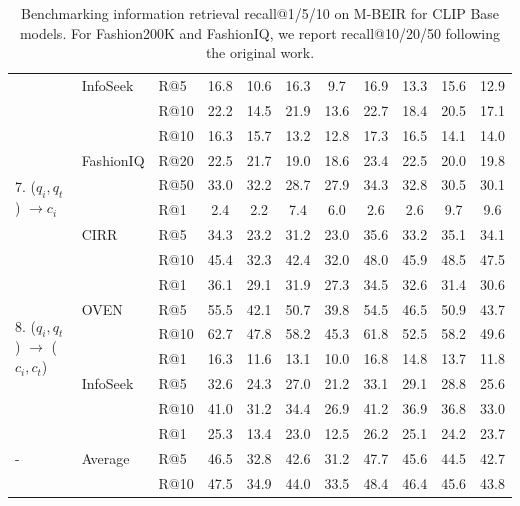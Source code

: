 \begin{table}[]
{\begin{tabular}{lll|cccc|cccc}
 & InfoSeek & R@5 & 16.8 & 10.6 & 16.3 & 9.7 & 16.9 & 13.3 & 15.6 & 12.9\\
 &  & R@10 & 22.2 & 14.5 & 21.9 & 13.6 & 22.7 & 18.4 & 20.5 & 17.1\\
 \midrule
\multirow{6}{*}{7. ($q_i, q_t$) $	\to c_i$} &  & R@10 & 16.3 & 15.7 & 13.2 & 12.8 & 17.3 & 16.5 & 14.1 & 14.0\\
 & FashionIQ & R@20 & 22.5 & 21.7 & 19.0 & 18.6 & 23.4 & 22.5 & 20.0 & 19.8\\
 &  & R@50 & 33.0 & 32.2 & 28.7 & 27.9 & 34.3 & 32.8 & 30.5 & 30.1\\
 \cmidrule{2-11}
 &  & R@1 & 2.4 & 2.2 & 7.4 & 6.0 & 2.6 & 2.6 & 9.7 & 9.6\\
 & CIRR & R@5 & 34.3 & 23.2 & 31.2 & 23.0 & 35.6 & 33.2 & 35.1 & 34.1\\
 &  & R@10 & 45.4 & 32.3 & 42.4 & 32.0 & 48.0 & 45.9 & 48.5 & 47.5\\
 \midrule
\multirow{6}{*}{8. ($q_i, q_t$) $	\to$ ($c_i, c_t$)} & 
 & 
R@1 & 
36.1 & 
29.1 & 
31.9 & 
27.3 & 
34.5 & 
32.6 & 
31.4 & 
30.6\\
 & OVEN & R@5 & 55.5 & 42.1 & 50.7 & 39.8 & 54.5 & 46.5 & 50.9 & 43.7\\
 &  & R@10 & 62.7 & 47.8 & 58.2 & 45.3 & 61.8 & 52.5 & 58.2 & 49.6\\
 \cmidrule{2-11}
 &  & R@1 & 16.3 & 11.6 & 13.1 & 10.0 & 16.8 & 14.8 & 13.7 & 11.8\\
 & InfoSeek & R@5 & 32.6 & 24.3 & 27.0 & 21.2 & 33.1 & 29.1 & 28.8 & 25.6\\
 &  & R@10 & 41.0 & 31.2 & 34.4 & 26.9 & 41.2 & 36.9 & 36.8 & 33.0\\
 \midrule
\multirow{3}{*}{-} &  & R@1 & 25.3 & 13.4 & 23.0 & 12.5 & 26.2 & 25.1 & 24.2 & 23.7\\
 & Average & R@5 & 46.5 & 32.8 & 42.6 & 31.2 & 47.7 & 45.6 & 44.5 & 42.7\\
 &  & R@10 & 47.5 & 34.9 & 44.0 & 33.5 & 48.4 & 46.4 & 45.6 & 43.8\\
\bottomrule
\end{tabular}%
}
\caption{Benchmarking information retrieval recall@1/5/10 on M-BEIR for CLIP Base models. For Fashion200K and FashionIQ, we report recall@10/20/50 following the original work.}
\label{tab:clip_base}
\end{table}